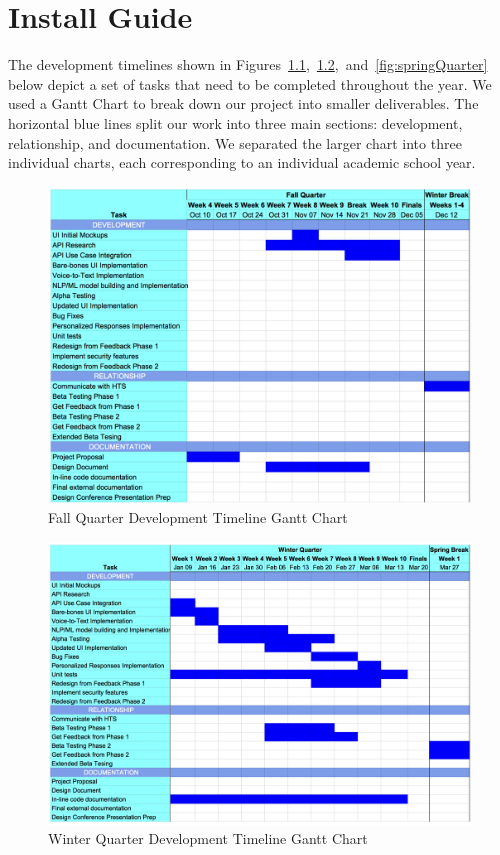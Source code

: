 \chapter{Install Guide}
The development timelines shown in Figures~\ref{fig:fallQuarter},~\ref{fig:winterQuarter},~and~\ref{fig:springQuarter} below depict a set of tasks that need to be completed throughout the year. We used a Gantt Chart to break down our project into smaller deliverables. The horizontal blue lines split our work into three main sections: development, relationship, and documentation. We separated the larger chart into three individual charts, each corresponding to an individual academic school year.

\begin{figure}[htb]
\centering
\includegraphics[width =\textwidth]{fallQuarter.png}
\caption{Fall Quarter Development Timeline Gantt Chart}
\label{fig:fallQuarter}
\end{figure}

\begin{figure}[htb]
\centering
\includegraphics[width =\textwidth]{winterQuarter.png}
\caption{Winter Quarter Development Timeline Gantt Chart}
\label{fig:winterQuarter}
\end{figure}


